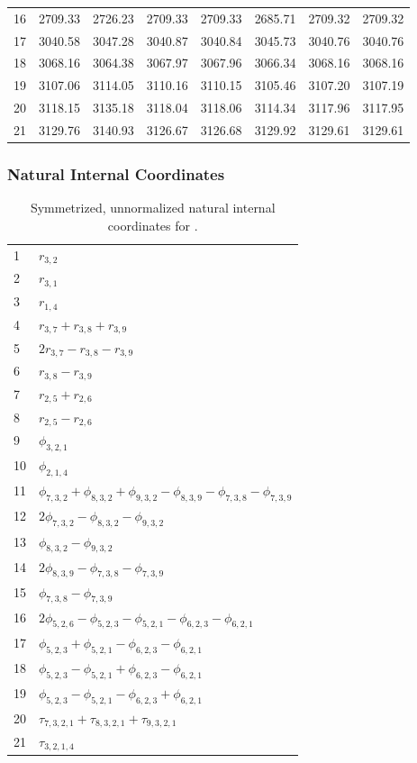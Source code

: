 \documentclass[10pt,oneside]{article}
\begin{document}
\begin{table}[h!]
\begin{tabular}{cccccccc}
16 &   2709.33 & 2726.23 & 2709.33 & 2709.33 &      2685.71 & 2709.32 & 2709.32 \\
17 &   3040.58 & 3047.28 & 3040.87 & 3040.84 &      3045.73 & 3040.76 & 3040.76 \\
18 &   3068.16 & 3064.38 & 3067.97 & 3067.96 &      3066.34 & 3068.16 & 3068.16 \\
19 &   3107.06 & 3114.05 & 3110.16 & 3110.15 &      3105.46 & 3107.20 & 3107.19 \\
20 &   3118.15 & 3135.18 & 3118.04 & 3118.06 &      3114.34 & 3117.96 & 3117.95 \\
21 &   3129.76 & 3140.93 & 3126.67 & 3126.68 &      3129.92 & 3129.61 & 3129.61 \\
\bottomrule
\end{tabular}
\end{table}

\clearpage

\subsubsection*{Natural Internal Coordinates}
\begin{table}[h!]
\centering
\caption{Symmetrized, unnormalized natural internal coordinates for .}
\small
\begin{tabular}{ll}
  1   & $r_{3,2}$ \\
  2   & $r_{3,1}$ \\
  3   & $r_{1,4}$ \\
  4   & $r_{3,7} + r_{3,8} + r_{3,9}$ \\
  5   & $2r_{3,7} - r_{3,8} - r_{3,9}$ \\
  6   & $r_{3,8} - r_{3,9}$ \\
  7   & $r_{2,5} + r_{2,6}$ \\
  8   & $r_{2,5} - r_{2,6}$ \\
  9   & $\phi_{3,2,1}$ \\
  10  & $\phi_{2,1,4}$ \\
  11  & $\phi_{7,3,2} + \phi_{8,3,2} + \phi_{9,3,2} - \phi_{8,3,9} - \phi_{7,3,8} - \phi_{7,3,9}$ \\
  12  & $2\phi_{7,3,2} - \phi_{8,3,2} - \phi_{9,3,2}$ \\
  13  & $\phi_{8,3,2} - \phi_{9,3,2}$ \\
  14  & $2\phi_{8,3,9} - \phi_{7,3,8} - \phi_{7,3,9}$ \\
  15  & $\phi_{7,3,8} - \phi_{7,3,9}$ \\
  16  & $2\phi_{5,2,6} - \phi_{5,2,3} - \phi_{5,2,1} - \phi_{6,2,3} - \phi_{6,2,1}$ \\
  17  & $\phi_{5,2,3} + \phi_{5,2,1} - \phi_{6,2,3} - \phi_{6,2,1}$ \\
  18  & $\phi_{5,2,3} - \phi_{5,2,1} + \phi_{6,2,3} - \phi_{6,2,1}$ \\
  19  & $\phi_{5,2,3} - \phi_{5,2,1} - \phi_{6,2,3} + \phi_{6,2,1}$ \\
  20  & $\tau_{7,3,2,1} + \tau_{8,3,2,1} + \tau_{9,3,2,1}$ \\
  21  & $\tau_{3,2,1,4}$ \\
\end{tabular}
\end{table}
\end{document}
